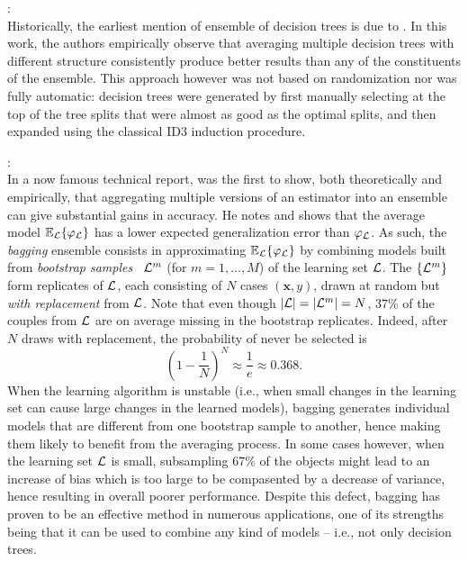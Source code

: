 \begin{description}

\item \citet{kwok:1990}: \hfill \\
    Historically, the earliest mention of ensemble of decision trees is due to
    \citet{kwok:1990}. In this work, the authors empirically observe that
    averaging multiple decision trees with different structure consistently
    produce better results than any of the constituents of the ensemble. This
    approach however was not based on randomization nor was fully automatic:
    decision trees were generated by first manually selecting at the top of the
    tree splits that were almost as good as the optimal splits, and then
    expanded using the classical ID3 induction procedure.

\item \citet{breiman:1996b}: \hfill \\
    In a now famous technical report, \citet{breiman:1996b} was the first to
    show, both theoretically and empirically, that aggregating multiple
    versions of an estimator into an ensemble can give substantial gains in
    accuracy. He notes and shows that the average model $\mathbb{E}_{\cal L}\{
    \varphi_{\cal L} \}$ has a lower expected generalization error than
    $\varphi_{\cal L}$. As such, the \textit{bagging} ensemble consists in
    approximating $\mathbb{E}_{\cal L}\{ \varphi_{\cal L} \}$  by combining
    models built from \textit{bootstrap samples}~\citep{efron:1979} ${\cal
    L}^m$ (for $m=1,\dots,M$) of the learning set ${\cal L}$. The $\{ {\cal
    L}^m \}$ form replicates of ${\cal L}$, each consisting of $N$ cases $(\mathbf{x},y)$, drawn
    at random but \textit{with replacement} from ${\cal L}$. Note that even
    though $|{\cal L}|=|{\cal L}^m|=N$, $37\%$ of the couples from ${\cal L}$
    are on average missing in the bootstrap replicates. Indeed, after $N$ draws
    with replacement, the probability of never be selected is
    \begin{equation}
    (1 - \frac{1}{N})^N \approx \frac{1}{e} \approx 0.368.
    \end{equation}
    When the learning algorithm is unstable (i.e., when small changes in the
    learning set can cause large changes in the learned models), bagging
    generates individual models that are  different from one bootstrap sample
    to another, hence making them likely to benefit from the averaging process.
    In some cases however, when the learning set ${\cal L}$ is small,
    subsampling $67\%$ of the objects might lead to an increase of bias which
    is too large to be compasented by a decrease of variance, hence resulting
    in overall poorer performance. Despite this defect, bagging has proven to
    be an effective method in numerous applications, one of its strengths being
    that it can be used to combine any kind of models -- i.e., not only
    decision trees.


\end{description}
